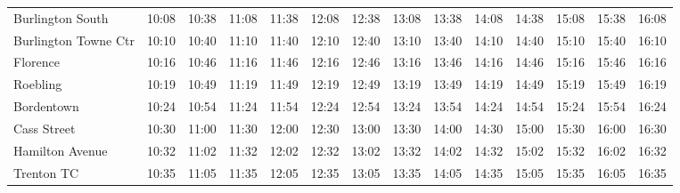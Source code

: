 \begin{center}
\begin{tabular}{@{}lrrrrrrrrrrrrr@{}}
Burlington South & 10:08 & 10:38 & 11:08 & 11:38 & 12:08 & 12:38 & 13:08 & 13:38 & 14:08 & 14:38 & 15:08 & 15:38 & 16:08 \\
Burlington Towne Ctr & 10:10 & 10:40 & 11:10 & 11:40 & 12:10 & 12:40 & 13:10 & 13:40 & 14:10 & 14:40 & 15:10 & 15:40 & 16:10 \\
Florence & 10:16 & 10:46 & 11:16 & 11:46 & 12:16 & 12:46 & 13:16 & 13:46 & 14:16 & 14:46 & 15:16 & 15:46 & 16:16 \\
Roebling & 10:19 & 10:49 & 11:19 & 11:49 & 12:19 & 12:49 & 13:19 & 13:49 & 14:19 & 14:49 & 15:19 & 15:49 & 16:19 \\
Bordentown & 10:24 & 10:54 & 11:24 & 11:54 & 12:24 & 12:54 & 13:24 & 13:54 & 14:24 & 14:54 & 15:24 & 15:54 & 16:24 \\
Cass Street & 10:30 & 11:00 & 11:30 & 12:00 & 12:30 & 13:00 & 13:30 & 14:00 & 14:30 & 15:00 & 15:30 & 16:00 & 16:30 \\
Hamilton Avenue & 10:32 & 11:02 & 11:32 & 12:02 & 12:32 & 13:02 & 13:32 & 14:02 & 14:32 & 15:02 & 15:32 & 16:02 & 16:32 \\
Trenton TC & 10:35 & 11:05 & 11:35 & 12:05 & 12:35 & 13:05 & 13:35 & 14:05 & 14:35 & 15:05 & 15:35 & 16:05 & 16:35 \\
\bottomrule\end{tabular}\end{center}
